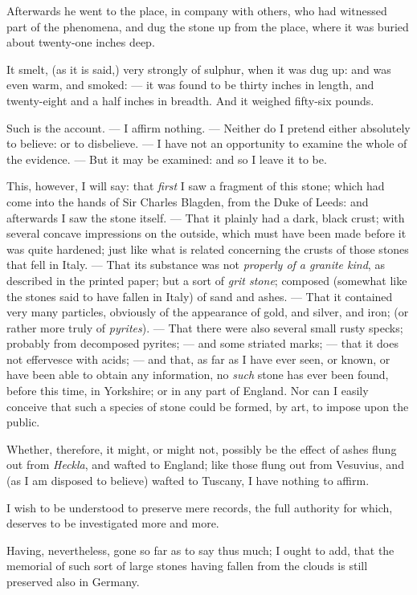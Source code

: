 \documentclass[a4paper, 12pt, oneside, twocolumn]{article}
\begin{document}
Afterwards he went to the place, in company with others, who had witnessed part of the phenomena, and dug the stone up from the place, where it was buried about twenty-one inches deep.

It smelt, (as it is said,) very strongly of sulphur, when it was dug up: and was even warm, and smoked: --- it was found to be thirty inches in length, and twenty-eight and a half inches in breadth. And it weighed fifty-six pounds.

Such is the account. --- I affirm nothing. --- Neither do I pretend either absolutely to believe: or to disbelieve. --- I have not an opportunity to examine the whole of the evidence. --- But it may be examined: and so I leave it to be.

This, however, I will say: that \emph{first} I saw a fragment of this stone; which had come into the hands of Sir Charles Blagden, from the Duke of Leeds: and afterwards I saw the stone itself. --- That it plainly had a dark, black crust; with several concave impressions on the outside, which must have been made before it was quite hardened; just like what is related concerning the crusts of those stones that fell in Italy. --- That its substance was not \emph{properly of a granite kind}, as described in the printed paper; but a sort of \emph{grit stone}; composed (somewhat like the stones said to have fallen in Italy) of sand and ashes. --- That it contained very many particles, obviously of the appearance of gold, and silver, and iron; (or rather more truly of \emph{pyrites}). --- That there were also several small rusty specks; probably from decomposed pyrites; --- and some striated marks; --- that it does not effervesce with acids; --- and that, as far as I have ever seen, or known, or have been able to obtain any information, no \emph{such} stone has ever been found, before this time, in Yorkshire; or in any part of England. Nor can I easily conceive that such a species of stone could be formed, by art, to impose upon the public.

Whether, therefore, it might, or might not, possibly be the effect of ashes flung out from \emph{Heckla}, and wafted to England; like those flung out from Vesuvius, and (as I am disposed to believe) wafted to Tuscany, I have nothing to affirm.

I wish to be understood to preserve mere records, the full authority for which, deserves to be investigated more and more.

Having, nevertheless, gone so far as to say thus much; I ought to add, that the memorial of such sort of large stones having fallen from the clouds is still preserved also in Germany.
\end{document}
